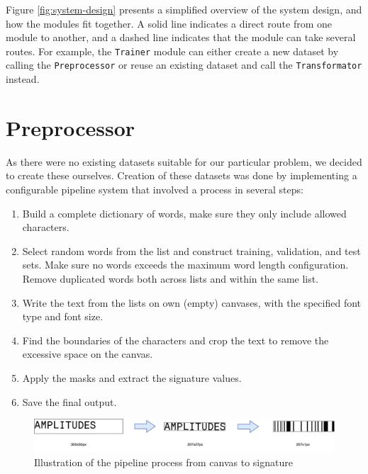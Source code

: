 Figure \ref{fig:system-design} presents a simplified overview of the system design, and how the modules fit together. A solid line indicates a direct route from one module to another, and a dashed line indicates that the module can take several routes. For example, the {\tt Trainer} module can either create a new dataset by calling the {\tt Preprocessor} or reuse an existing dataset and call the {\tt Transformator} instead.


\section{Preprocessor}
\label{sec:preprocessor}
As there were no existing datasets suitable for our particular problem, we decided to create these ourselves. Creation of these datasets was done by implementing a configurable pipeline system that involved a process in several steps:

\begin{enumerate}
    \item Build a complete dictionary of words, make sure they only include allowed characters.
    \item Select random words from the list and construct training, validation, and test sets. Make sure no words exceeds the maximum word length configuration. Remove duplicated words both across lists and within the same list.
    \item Write the text from the lists on own (empty) canvases, with the specified font type and font size.
    \item Find the boundaries of the characters and crop the text to remove the excessive space on the canvas.
    \item Apply the masks and extract the signature values.
    \item Save the final output.
\end{enumerate}

\begin{figure}[H]
    \centering
    \includegraphics[width=1\textwidth]{fig/development_process/pipeline.png}
    \caption{Illustration of the pipeline process from canvas to signature}
    \label{fig:development-pipeline}
\end{figure}

